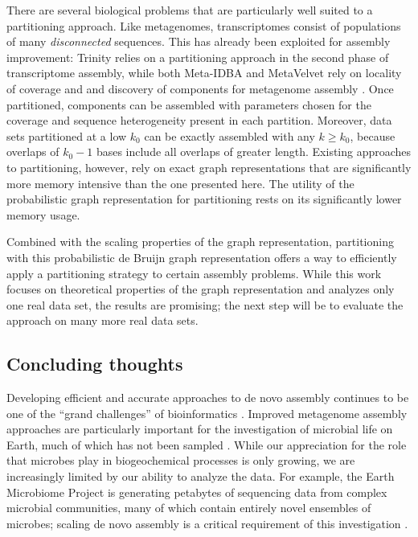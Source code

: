 \documentclass{pnastwo}
\begin{document}
\begin{article}

There are several biological problems that are particularly well
suited to a partitioning approach.  Like metagenomes, transcriptomes
consist of populations of many {\em disconnected} sequences.  This has
already been exploited for assembly improvement: Trinity relies on a
partitioning approach in the second phase of transcriptome assembly,
while both Meta-IDBA and MetaVelvet rely on locality of coverage and
and discovery of components for metagenome assembly
\cite{metavelvet,pubmed21685107,trinity}.  Once partitioned,
components can be assembled with parameters chosen for the coverage
and sequence heterogeneity present in each partition.  Moreover, data
sets partitioned at a low $k_0$ can be exactly assembled with any $k
\ge k_0$, because overlaps of $k_0-1$ bases include all overlaps of
greater length.  Existing approaches to partitioning, however, rely on
exact graph representations that are significantly more memory
intensive than the one presented here.  The utility of the
probabilistic graph representation for partitioning rests on its
significantly lower memory usage.

Combined with the scaling properties of the graph representation,
partitioning with this probabilistic de Bruijn graph representation
offers a way to efficiently apply a partitioning strategy to certain
assembly problems.  While this work focuses on theoretical properties
of the graph representation and analyzes only one real data set, the
results are promising; the next step will be to evaluate the approach
on many more real data sets.

\subsection{Concluding thoughts}


Developing efficient and accurate approaches to de novo assembly
continues to be one of the ``grand challenges'' of bioinformatics
\cite{pubmed22147368}.  Improved metagenome assembly approaches are
particularly important for the investigation of microbial life on
Earth, much of which has not been sampled \cite{terabasemetag}.  While
our appreciation for the role that microbes play in biogeochemical
processes is only growing, we are increasingly limited by our ability
to analyze the data.  For example, the Earth Microbiome Project is
generating petabytes of sequencing data from complex microbial
communities, many of which contain entirely novel ensembles of
microbes; scaling de novo assembly is a critical requirement of this
investigation \cite{emp2010}.


\end{article}
\end{document}
